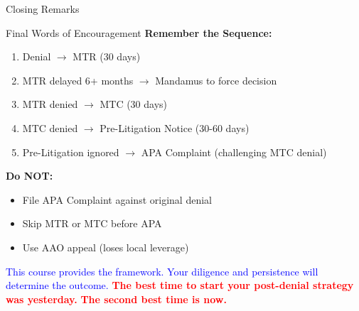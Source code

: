\documentclass[11pt]{beamer}
\begin{document}
	\begin{frame}{Closing Remarks}
		\scriptsize
		\begin{block}{Final Words of Encouragement}
			\textbf{Remember the Sequence:}
			\begin{enumerate}
				\item Denial $\rightarrow$ MTR (30 days)
				\item MTR delayed 6+ months $\rightarrow$ Mandamus to force decision
				\item MTR denied $\rightarrow$ MTC (30 days)
				\item MTC denied $\rightarrow$ Pre-Litigation Notice (30-60 days)
				\item Pre-Litigation ignored $\rightarrow$ APA Complaint (challenging MTC denial)
			\end{enumerate}
			\textbf{Do NOT:}
			\begin{itemize}
				\item File APA Complaint against original denial
				\item Skip MTR or MTC before APA
				\item Use AAO appeal (loses local leverage)
			\end{itemize}
			\vspace{0.3cm}
			\textcolor{blue}{This course provides the framework. Your diligence and persistence will determine the outcome.}
			\vspace{0.3cm}
			\textcolor{red}{\textbf{The best time to start your post-denial strategy was yesterday.}}
			\textcolor{red}{\textbf{The second best time is now.}}
		\end{block}
	\end{frame}
	
\end{document}
